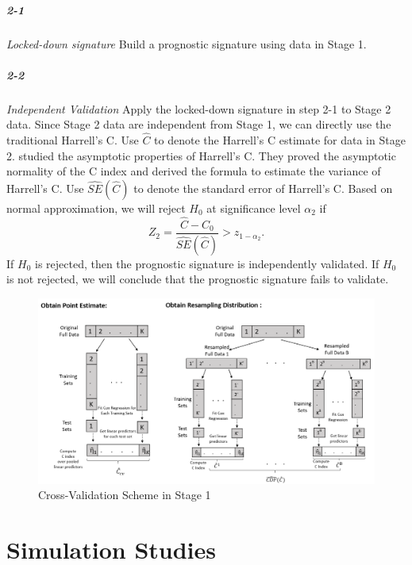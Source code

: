 \documentclass[11pt]{article}
\begin{document}
		\subparagraph{2-1} \textit{Locked-down signature} Build a prognostic signature using data in Stage 1.

		\subparagraph{2-2} \textit{Independent Validation} Apply the locked-down signature in step 2-1 to Stage 2 data. Since Stage 2 data are independent from Stage 1, we can directly use the traditional Harrell's C. Use $\hat{C}$ to denote the Harrell's C estimate for data in Stage 2. \citep{Pencina2004} studied the asymptotic properties of Harrell's C. They proved the asymptotic normality of the C index and derived the formula to estimate the variance of Harrell's C. Use $\widehat{SE}(\hat{C})$ to denote the standard error of Harrell's C. Based on normal approximation, we will reject $H_0$ at significance level $\alpha_2$ if $$Z_{2} = \frac{\hat{C} - C_{0}}{\widehat{SE}(\hat{C})} > z_{1-\alpha_{2}}.$$ If $H_0$ is rejected, then the prognostic signature is independently validated. If $H_0$ is not rejected, we will conclude that the prognostic signature fails to validate.
	

	
	\begin{figure}
	\caption{Cross-Validation Scheme in Stage 1}
	\includegraphics[width=16cm]{diagram.PNG}
	\end{figure}


\section{Simulation Studies}
	
\end{document}
